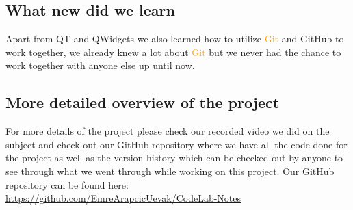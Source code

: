\documentclass[a4paper, 11pt]{article}
\begin{document}
			\subsection{What new did we learn}
				\noindent Apart from QT and QWidgets we also learned how to utilize \textcolor{orange}{Git} and GitHub to work together, we already knew a lot about \textcolor{orange}{Git} but we never had the chance to work together with anyone else up until now.
			\subsection{More detailed overview of the project}
				\noindent For more details of the project please check our recorded video we did on the subject and check out our GitHub repository where we have all the code done for the project as well as the version history which can be checked out by anyone to see through what we went through while working on this project. Our GitHub repository can be found here:\\ \url{https://github.com/EmreArapcicUevak/CodeLab-Notes}
\end{document}
